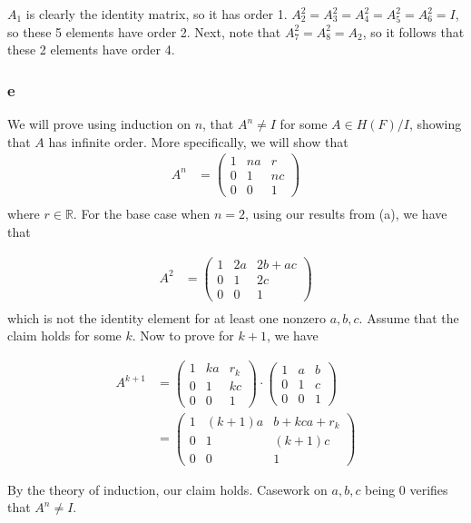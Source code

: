 \documentclass[11 pt]{article}
\theoremstyle{definition}
\theoremstyle{remark}
\begin{document}
$A_1$ is clearly the identity matrix, so it has order 1. $A_2^2=A_3^2=A_4^2=A_5^2=A_6^2=I$, so these 5 elements have order 2. Next, note that $A_7^2=A_8^2=A_2$, so it follows that these 2 elements have order 4.

\subsubsection*{e}
We will prove using induction on $n$, that $A^n \neq I$ for some $A \in H(F)/I$, showing that $A$ has infinite order. More specifically, we will show that 
\begin{align*}
A^n &= \begin{pmatrix}
1 & na & r\\
0 & 1 & nc\\
0 & 0 & 1
\end{pmatrix}
\\
\end{align*}
where $r \in \mathbb{R}$.
For the base case when $n=2$, using our results from (a), we have that

\begin{align*}
A^2 &= \begin{pmatrix}
1 & 2a & 2b+ac\\
0 & 1 & 2c\\
0 & 0 & 1
\end{pmatrix}
\\
\end{align*}
which is not the identity element for at least one nonzero $a,b,c$. Assume that the claim holds for some $k$. Now to prove for $k+1$, we have 

\begin{align*}
A^{k+1} &= \begin{pmatrix}
1 & ka & r_k\\
0 & 1 & kc\\
0 & 0 & 1
\end{pmatrix} \cdot
\begin{pmatrix}
1 & a & b\\
0 & 1 & c\\
0 & 0 & 1
\end{pmatrix}
\\
&= \begin{pmatrix}
1 & (k+1)a & b+kca+r_k\\
0 & 1 & (k+1)c\\
0 & 0 & 1
\end{pmatrix}
\end{align*}

By the theory of induction, our claim holds. Casework on $a,b,c$ being 0 verifies that $A^n \neq I$.
\end{document}
